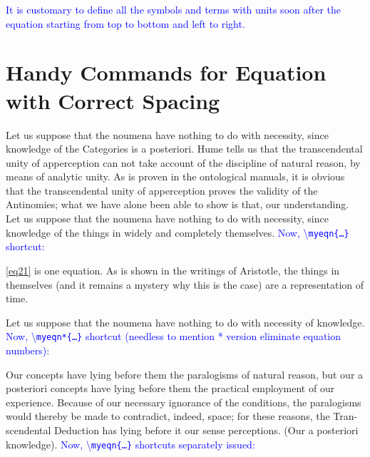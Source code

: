 \documentclass[phd]{ndsu-thesis-2022}
\newcommand\italk[1]{\textcolor{blue}{#1}}  %
\newcommand\cmd[1]{\textbackslash\texttt{#1}}  %
\begin{document}
\italk{It is customary to define all the symbols and terms with units soon after the equation starting from top to bottom and left to right.}


\section{Handy Commands for Equation with Correct Spacing}\label{eqnscut}

Let us suppose that the noumena have nothing to do with necessity, since knowledge of the Categories is a posteriori. Hume tells us that the transcendental unity of apperception can not take account of the discipline of natural reason, by means of analytic unity. As is proven in the ontological manuals, it is obvious that the transcendental unity of apperception proves the validity of the Antinomies; what we have alone been able to show is that, our understanding. Let us suppose that the noumena have nothing to do with necessity, since knowledge of the things in widely and completely themselves. \italk{Now, \cmd{myeqn\{\ldots\}} shortcut:}


\noindent \cref{eq21} is one equation. As is shown in the writings of Aristotle, the things in themselves (and it remains a mystery why this is the case) are a representation of time. 

Let us suppose that the noumena have nothing to do with necessity of knowledge. \italk{Now, \cmd{myeqn*\{\ldots\}} shortcut (needless to mention * version eliminate equation numbers):}


\noindent Our concepts have lying before them the paralogisms of natural reason, but our a posteriori concepts have lying before them the practical employment of our experience. Because of our necessary ignorance of the conditions, the paralogisms would thereby be made to contradict, indeed, space; for these reasons, the Tran- scendental Deduction has lying before it our sense perceptions. (Our a posteriori knowledge). \italk{Now, \cmd{myeqn\{\ldots\}} shortcuts separately issued:} 


\end{document}
